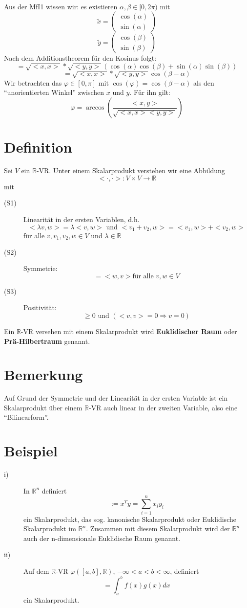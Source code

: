 \documentclass{scrbook}
\begin{document}
\\
Aus der MfI1 wissen wir: es existieren $\alpha,\beta \in [0,2\pi)$ mit
\[\tilde{x}=\left(
\begin{array}{c}
\cos (\alpha)\\\sin (\alpha)
\end{array}
\right)\]
\[\tilde{y}=\left(
\begin{array}{c}
\cos (\beta)\\\sin (\beta)
\end{array}
\right)\]
Nach dem Additionstheorem für den Kosinus folgt:
\[<x,y> = \sqrt{<x,x>} *\sqrt{<y,y>}(\cos(\alpha)\cos(\beta)+\sin(\alpha)\sin(\beta))\]
\[= \sqrt{<x,x>} *\sqrt{<y,y>} \cos (\beta-\alpha)\]
Wir betrachten das $\varphi \in [0,\pi]$ mit $\cos(\varphi) = \cos(\beta-\alpha)$ als den "`unorientierten Winkel"' zwischen $x$ und $y$. Für ihn gilt:
\[\varphi = \arccos\left(\frac{<x,y>}{\sqrt{<x,x><y,y>}}\right)\]
\section{Definition}
Sei $V$ ein $\mathbb{R}$-VR. Unter einem Skalarprodukt verstehen wir eine Abbildung
\[<\cdot,\cdot>:V\times V \to \mathbb{R}\]
mit
\begin{description}
\item[(S1)] Linearität in der ersten Variablen, d.h.
\[<\lambda v,w> = \lambda<v,w> \text{ und } <v_1+v_2,w >= <v_1,w>+<v_2,w>\]
für alle $v,v_1,v_2,w \in V$ und $\lambda \in \mathbb{R}$
\item[(S2)] Symmetrie:\[<v,w>= <w,v> \text{für alle } v,w \in V\]
\item[(S3)] Positivität:\[<v,v> \geq 0 \text{ und } (<v,v> = 0 \Rightarrow v=0)\]
\end{description}
Ein $\mathbb{R}$-VR versehen mit einem Skalarprodukt wird \textbf{Euklidischer Raum} oder \textbf{Prä-Hilbertraum} genannt.
\section{Bemerkung}
Auf Grund der Symmetrie und der Linearität in der ersten Variable ist ein Skalarprodukt über einem $\mathbb{R}$-VR auch linear in der zweiten Variable, also eine "`Bilinearform"'.
\section{Beispiel}
\begin{description}
\item[i)] In $\mathbb{R}^n$ definiert
\[<x,y> := x^T y = \sum^n_{i=1} x_i y_i\]
ein Skalarprodukt, das sog. kanonische Skalarprodukt oder Euklidische Skalarprodukt im $\mathbb{R}^n$. Zusammen mit diesem Skalarprodukt wird der $\mathbb{R}^n$ auch der n-dimensionale Euklidische Raum genannt.
\item[ii)] Auf dem $\mathbb{R}$-VR $\varphi([a,b],\mathbb{R})$, $-\infty <a <b <\infty$, definiert
\[<f,g> = \int^b_a f(x)g(x) dx\]
ein Skalarprodukt.
\end{description}
\end{document}
